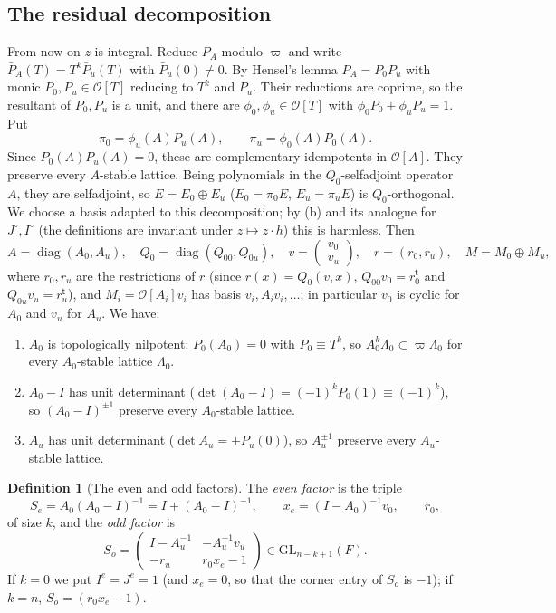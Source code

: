 \documentclass[11pt,oneside,notitlepage]{book}
\numberwithin{equation}{section}
\theoremstyle{plain}
\theoremstyle{definition}
\newtheorem{definition}[theorem]{Definition}
\newcommand{\cO}{\mathcal{O}}
\newcommand{\GL}{\mathrm{GL}}
\newcommand{\diag}{\operatorname{diag}}
\begin{document}
\subsection*{The residual decomposition}

From now on $z$ is integral. Reduce $P_A$ modulo $\varpi$ and write $\bar P_A(T)=T^k\bar P_u(T)$ with $\bar P_u(0)\ne0$. By Hensel's lemma $P_A=P_0P_u$ with monic $P_0,P_u\in\cO[T]$ reducing to $T^k$ and $\bar P_u$. Their reductions are coprime, so the resultant of $P_0,P_u$ is a unit, and there are $\phi_0,\phi_u\in\cO[T]$ with $\phi_0P_0+\phi_uP_u=1$. Put
\[\pi_0=\phi_u(A)P_u(A),\qquad\pi_u=\phi_0(A)P_0(A).\]
Since $P_0(A)P_u(A)=0$, these are complementary idempotents in $\cO[A]$. They preserve every $A$-stable lattice. Being polynomials in the $Q_0$-selfadjoint operator $A$, they are selfadjoint, so $E=E_0\oplus E_u$ ($E_0=\pi_0E$, $E_u=\pi_uE$) is $Q_0$-orthogonal. We choose a basis adapted to this decomposition; by (b) and its analogue for $J^\circ,I^\circ$ (the definitions are invariant under $z\mapsto z\cdot h$) this is harmless. Then
\[A=\diag(A_0,A_u),\quad Q_0=\diag(Q_{00},Q_{0u}),\quad v=\begin{pmatrix}v_0\\v_u\end{pmatrix},\quad r=(r_0,r_u),\quad M=M_0\oplus M_u,\]
where $r_0,r_u$ are the restrictions of $r$ (since $r(x)=Q_0(v,x)$, $Q_{00}v_0=r_0^{\mathsf t}$ and $Q_{0u}v_u=r_u^{\mathsf t}$), and $M_i=\cO[A_i]v_i$ has basis $v_i,A_iv_i,\dots$; in particular $v_0$ is cyclic for $A_0$ and $v_u$ for $A_u$. We have:
\begin{enumerate}[label=(\roman*)]
\item $A_0$ is topologically nilpotent: $P_0(A_0)=0$ with $P_0\equiv T^k$, so $A_0^k\Lambda_0\subset\varpi\Lambda_0$ for every $A_0$-stable lattice $\Lambda_0$.
\item $A_0-I$ has unit determinant ($\det(A_0-I)=(-1)^kP_0(1)\equiv(-1)^k$), so $(A_0-I)^{\pm1}$ preserve every $A_0$-stable lattice.
\item $A_u$ has unit determinant ($\det A_u=\pm P_u(0)$), so $A_u^{\pm1}$ preserve every $A_u$-stable lattice.
\end{enumerate}

\begin{definition}[The even and odd factors]\label{def:factors}
The \emph{even factor} is the triple
\[S_e=A_0(A_0-I)^{-1}=I+(A_0-I)^{-1},\qquad x_e=(I-A_0)^{-1}v_0,\qquad r_0,\]
of size $k$, and the \emph{odd factor} is
\[S_o=\begin{pmatrix}I-A_u^{-1}&-A_u^{-1}v_u\\-r_u&r_0x_e-1\end{pmatrix}\in\GL_{n-k+1}(F).\]
If $k=0$ we put $I^e=J^e=1$ (and $x_e=0$, so that the corner entry of $S_o$ is $-1$); if $k=n$, $S_o=(r_0x_e-1)$.
\end{definition}
\end{document}
